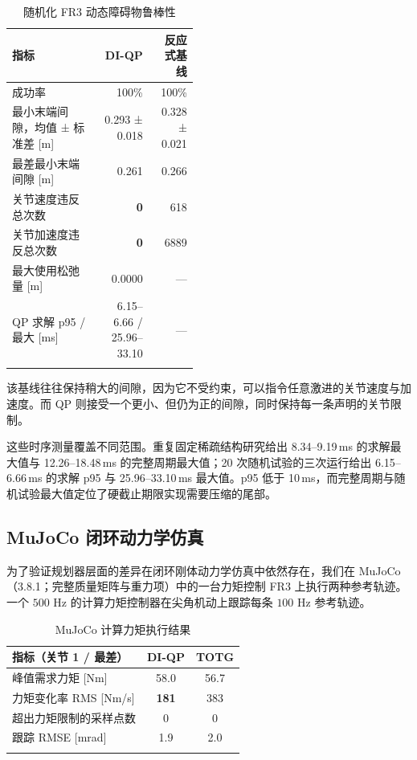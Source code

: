 {%
\begin{table}[t]
\caption{随机化 FR3 动态障碍物鲁棒性}
\label{tab:fr3-randomized}
\centering
\footnotesize
\setlength{\tabcolsep}{3pt}
\begin{tabular}{@{}>{\raggedright\arraybackslash}p{0.46\linewidth}rr@{}}
\toprule\noalign{}
指标 & DI-QP & 反应式基线 \\
\midrule\noalign{}
成功率 & 100\% & 100\% \\
最小末端间隙，均值 ± 标准差 {[}m{]} & 0.293 ± 0.018 & 0.328 ± 0.021 \\
最差最小末端间隙 {[}m{]} & 0.261 & 0.266 \\
关节速度违反总次数 & \textbf{0} & 618 \\
关节加速度违反总次数 & \textbf{0} & 6889 \\
最大使用松弛量 {[}m{]} & 0.0000 & --- \\
QP 求解 p95 / 最大 {[}ms{]} & 6.15--6.66 / 25.96--33.10 & --- \\
\bottomrule\noalign{}
\end{tabular}
\end{table}
}

该基线往往保持稍大的间隙，因为它不受约束，可以指令任意激进的关节速度与加速度。而 QP 则接受一个更小、但仍为正的间隙，同时保持每一条声明的关节限制。

这些时序测量覆盖不同范围。重复固定稀疏结构研究给出 8.34--9.19\,ms 的求解最大值与 12.26--18.48\,ms 的完整周期最大值；20 次随机试验的三次运行给出 6.15--6.66\,ms 的求解 p95 与 25.96--33.10\,ms 最大值。p95 低于 10\,ms，而完整周期与随机试验最大值定位了硬截止期限实现需要压缩的尾部。

\subsection{MuJoCo 闭环动力学仿真}\label{h.-physical-execution-in-mujoco}

为了验证规划器层面的差异在闭环刚体动力学仿真中依然存在，我们在 MuJoCo（3.8.1；完整质量矩阵与重力项）中的一台力矩控制 FR3 上执行两种参考轨迹。一个 \(500\) Hz 的计算力矩控制器在尖角机动上跟踪每条 \(100\) Hz 参考轨迹。

{%
\begin{table}[t]
\caption{MuJoCo 计算力矩执行结果}
\label{tab:mujoco-execution}
\centering
\footnotesize
\setlength{\tabcolsep}{3pt}
\begin{tabular}{@{}lcc@{}}
\toprule\noalign{}
指标（关节 1 / 最差） & DI-QP & TOTG \\
\midrule\noalign{}
峰值需求力矩 {[}Nm{]} & 58.0 & 56.7 \\
力矩变化率 RMS {[}Nm/s{]} & \textbf{181} & 383 \\
超出力矩限制的采样点数 & 0 & 0 \\
跟踪 RMSE {[}mrad{]} & 1.9 & 2.0 \\
\bottomrule\noalign{}
\end{tabular}
\end{table}
}

